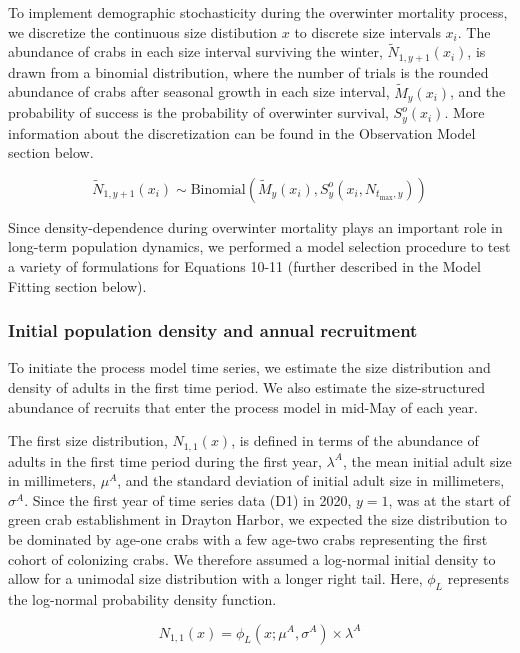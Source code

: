 \documentclass{article}
\begin{document}
To implement demographic stochasticity during the overwinter mortality process, we discretize the continuous size distibution $x$ to discrete size intervals $x_i$. The abundance of crabs in each size interval surviving the winter, $\tilde{N}_{1,y+1}(x_i)$, is drawn from a binomial distribution, where the number of trials is the rounded abundance of crabs after seasonal growth in each size interval, $\tilde{M}_y(x_i)$, and the probability of success is the probability of overwinter survival, $S^o_y(x_i)$. More information about the discretization can be found in the Observation Model section below.

\begin{equation}
\tilde{N}_{1,y+1}(x_i) \sim \text{Binomial}\left(\tilde{M}_y(x_i),  S_y^o(x_i, N_{t_{\text{max}},y})\right)
\end{equation}

Since density-dependence during overwinter mortality plays an important role in long-term population dynamics, we performed a model selection procedure to test a variety of formulations for Equations 10-11 (further described in the Model Fitting section below).

\subsubsection*{Initial population density and annual recruitment}

To initiate the process model time series, we estimate the size distribution and density of adults in the first time period. We also estimate the size-structured abundance of recruits that enter the process model in mid-May of each year. 

The first size distribution, $N_{1, 1}(x)$, is defined in terms of the abundance of adults in the first time period during the first year, $\lambda^{A}$, the mean initial adult size in millimeters, $\mu^A$, and the standard deviation of initial adult size in millimeters, $\sigma^A$. Since the first year of time series data (D1) in 2020, $y = 1$, was at the start of green crab establishment in Drayton Harbor, we expected the size distribution to be dominated by age-one crabs with a few age-two crabs representing the first cohort of colonizing crabs. We therefore assumed a log-normal initial density to allow for a unimodal size distribution with a longer right tail. Here, $\phi_L$ represents the log-normal probability density function.

\begin{equation}
N_{1, 1}(x) = \phi_L(x; \mu^A, \sigma^A) \times \lambda^A
\end{equation}
\end{document}
